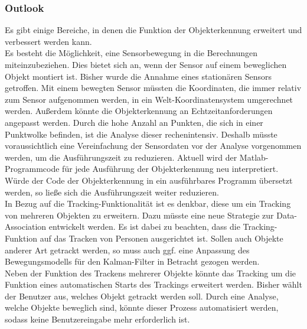 \subsubsection{Outlook}\label{sec:Outlook}
Es gibt einige Bereiche, in denen die Funktion der Objekterkennung erweitert und verbessert werden kann.\\
Es besteht die Möglichkeit, eine Sensorbewegung in die Berechnungen miteinzubeziehen. Dies bietet sich an, wenn der Sensor auf einem beweglichen Objekt montiert ist. Bisher wurde die Annahme eines stationären Sensors getroffen. Mit einem bewegten Sensor müssten die Koordinaten, die immer relativ zum Sensor aufgenommen werden, in ein Welt-Koordinatensystem umgerechnet werden.
Außerdem könnte die Objekterkennung an Echtzeitanforderungen angepasst werden. Durch die hohe Anzahl an Punkten, die sich in einer Punktwolke befinden, ist die Analyse dieser rechenintensiv. Deshalb müsste voraussichtlich eine Vereinfachung der Sensordaten vor der Analyse vorgenommen werden, um die Ausführungszeit zu reduzieren. Aktuell wird der Matlab-Programmcode für jede Ausführung der Objekterkennung neu interpretiert. Würde der Code der Objekterkennung in ein ausführbares Programm übersetzt werden, so ließe sich die Ausführungszeit weiter reduzieren.\\
In Bezug auf die Tracking-Funktionalität ist es denkbar, diese um ein Tracking von mehreren Objekten zu erweitern. Dazu müsste eine neue Strategie zur Data-Association entwickelt werden. Es ist dabei zu beachten, dass die Tracking-Funktion auf das Tracken von Personen ausgerichtet ist. Sollen auch Objekte anderer Art getrackt werden, so muss auch ggf. eine Anpassung des Bewegungsmodells für den Kalman-Filter in Betracht gezogen werden.\\
Neben der Funktion des Trackens mehrerer Objekte könnte das Tracking um die Funktion eines automatischen Starts des Trackings erweitert werden. Bisher wählt der Benutzer aus, welches Objekt getrackt werden soll. Durch eine Analyse, welche Objekte beweglich sind, könnte dieser Prozess automatisiert werden, sodass keine Benutzereingabe mehr erforderlich ist.
 